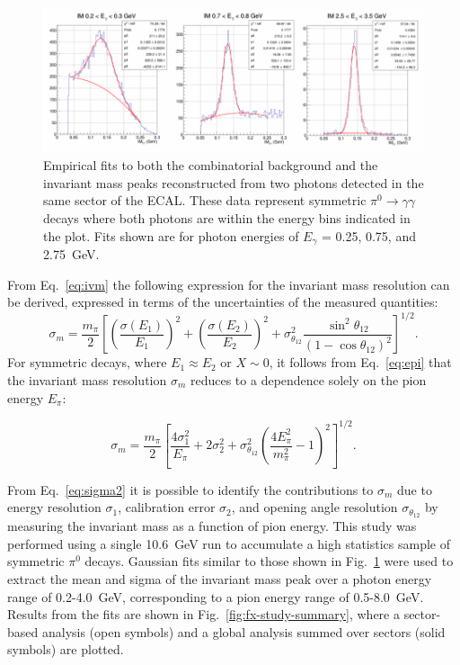 \begin{figure}[h]
\centering
\includegraphics[width=1.0\columnwidth,keepaspectratio]{img/fx-pi0-fits.png}
\caption[]{Empirical fits to both the combinatorial background and the invariant mass peaks reconstructed from two
  photons detected in the same sector of the ECAL. These data represent symmetric
  $\pi^0 \rightarrow \gamma \gamma$ decays where both photons are within the energy bins indicated in the plot.
  Fits shown are for photon energies of $E_{\gamma}$ = 0.25, 0.75, and 2.75~GeV.}
\label{fig:fx-pi0-fits}
\end{figure}

From Eq.~\ref{eq:ivm} the following expression for the invariant mass resolution can be derived, expressed in terms of the uncertainties of the measured quantities:
\begin{equation}
  \sigma_m  = \frac{m_{\pi}}{2}\left[\left(\frac{\sigma(E_1)}{E_1}\right)^2 + \left(\frac{\sigma(E_2)}{E_2}\right)^2
    + \sigma^2_{\theta_{12}}\frac{\sin^2 \theta_{12}}{(1-\cos \theta_{12})^2}\right]^{1/2}.
\label{eq:sigmam1}
\end{equation}
For symmetric decays, where $E_1 \approx E_2$ or $X\sim 0$, it follows from Eq.~\ref{eq:epi} that the invariant mass resolution $\sigma_m$
reduces to a dependence solely on the pion energy $E_{\pi}$:

\begin{equation}
  \sigma_m = \frac{m_{\pi}}{2}\left[\frac{4 \sigma^2_1}{E_{\pi}} + 2 \sigma^2_2 +
    \sigma^2_{\theta_{12}}\left(\frac{4 E^2_{\pi}}{m^2_{\pi}}-1\right)^2\right]^{1/2}.
\label{eq:sigma2}
\end{equation}

From Eq.~\ref{eq:sigma2} it is possible to identify the contributions to $\sigma_m$ due to energy resolution
$\sigma_1$, calibration error $\sigma_2$, and opening angle resolution $\sigma_{\theta_{12}}$ by measuring the
invariant mass as a function of pion energy. This study was performed using a single 10.6~GeV run to accumulate
a high statistics sample of symmetric $\pi^{0}$ decays. Gaussian fits similar to those shown in
Fig.~\ref{fig:fx-pi0-fits} were used to extract the mean and sigma of the invariant mass peak over a photon energy
range of 0.2-4.0~GeV, corresponding to a pion energy range of 0.5-8.0~GeV. Results from the fits are shown in
Fig.~\ref{fig:fx-study-summary}, where a sector-based analysis (open symbols) and a global analysis summed over
sectors (solid symbols) are plotted.  

